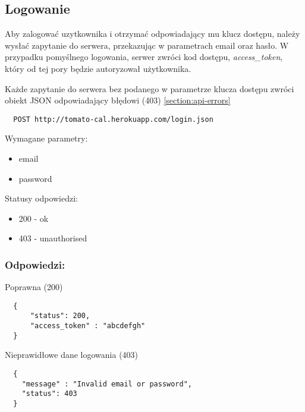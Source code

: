 \subsection{Logowanie}

Aby zalogować uzytkownika i otrzymać odpowiadający mu klucz dostępu, należy wysłać zapytanie do serwera, przekazując w parametrach email oraz hasło. W przypadku pomyślnego logowania, serwer zwróci kod dostępu, \textit{access\_token}, który od tej pory będzie autoryzował użytkownika.

Każde zapytanie do serwera bez podanego w parametrze klucza dostępu zwróci obiekt JSON odpowiadający błędowi (403) \ref{section:api-errors}


\begin{lstlisting}
  POST http://tomato-cal.herokuapp.com/login.json
\end{lstlisting}

Wymagane parametry:
\begin{itemize}
  \item email
  \item password
\end{itemize}

Statusy odpowiedzi:
\begin{itemize}
  \item 200 - ok
  \item 403 - unauthorised
\end{itemize}

\subsubsection{Odpowiedzi:}

Poprawna (200)
\begin{lstlisting}
  {
      "status": 200,
      "access_token" : "abcdefgh"
  }
\end{lstlisting}

Nieprawidłowe dane logowania (403)
\begin{lstlisting}
  {
    "message" : "Invalid email or password",
    "status": 403
  }
\end{lstlisting}
